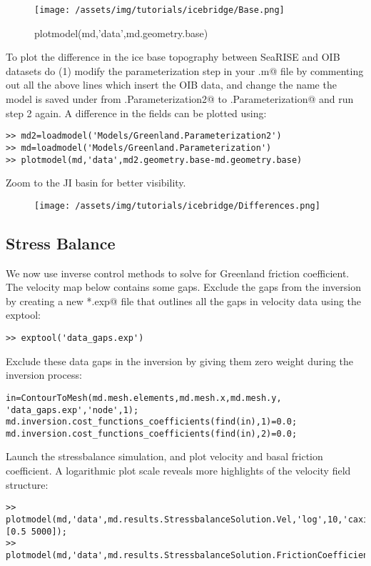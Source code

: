 \begin{figure}[H]
	\begin{center}
	\texttt{[image: /assets/img/tutorials/icebridge/Base.png]}
	\caption{plotmodel(md,'data',md.geometry.base)}
	\end{center}
\end{figure}
To plot the difference in the ice base topography between SeaRISE and OIB datasets do (1) modify the parameterization step in your \verb@runme.m@ file by commenting out all the above lines which insert the OIB data, and change the name the model is saved under from \verb@Greenland.Parameterization2@ to \verb@Greenland.Parameterization@ and run step 2 again. A difference in the fields can be plotted using:
\begin{verbatim}>> md2=loadmodel('Models/Greenland.Parameterization2')
>> md=loadmodel('Models/Greenland.Parameterization')
>> plotmodel(md,'data',md2.geometry.base-md.geometry.base)\end{verbatim}
Zoom to the JI basin for better visibility.
\begin{figure}[H]
	\begin{center}
		\texttt{[image: /assets/img/tutorials/icebridge/Differences.png]}
	\end{center}
\end{figure}
\subsection{Stress Balance} %
We now use inverse control methods to solve for Greenland friction coefficient. The velocity map below contains some gaps. Exclude the gaps from the inversion by creating a new \verb@*.exp@ file that outlines all the gaps in velocity data using the exptool:
\begin{verbatim}>> exptool('data_gaps.exp')\end{verbatim}

Exclude these data gaps in the inversion by giving them zero weight during the inversion process:
\begin{verbatim}in=ContourToMesh(md.mesh.elements,md.mesh.x,md.mesh.y, 'data_gaps.exp','node',1);
md.inversion.cost_functions_coefficients(find(in),1)=0.0;
md.inversion.cost_functions_coefficients(find(in),2)=0.0;\end{verbatim}

Launch the stressbalance simulation, and plot velocity and basal friction coefficient. A logarithmic
plot scale reveals more highlights of the velocity field structure:
\begin{verbatim}>> plotmodel(md,'data',md.results.StressbalanceSolution.Vel,'log',10,'caxis',[0.5 5000]);
>> plotmodel(md,'data',md.results.StressbalanceSolution.FrictionCoefficient);\end{verbatim}

